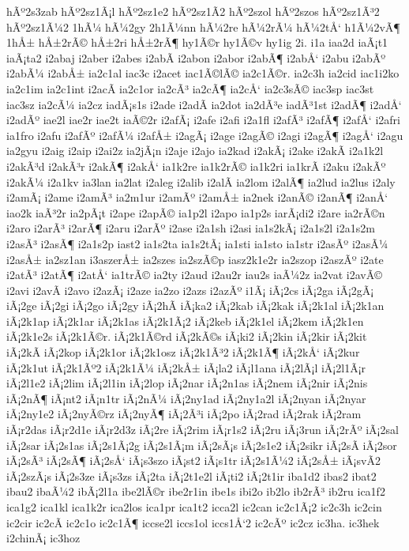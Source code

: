 {hÃº2s3zab
hÃº2sz1Ã¡l
hÃº2sz1e2
hÃº2sz1Ã­2
hÃº2szol
hÃº2szos
hÃº2sz1Ã³2
hÃº2sz1Ã¼2
1hÃ¼
hÃ¼2gy
2h1Ã¼nn
hÃ¼2re
hÃ¼2rÃ¼
hÃ¼2tÅ‘
h1Ã¼2vÃ¶
1hÅ±
hÅ±2rÃ©
hÅ±2ri
hÅ±2rÃ¶
hy1Ã©r
hy1Ã©v
hy1ig
2i.
i1a
iaa2d
iaÃ¡t1
iaÃ¡ta2
i2abaj
i2aber
i2abes
i2abÃ­
i2abon
i2abor
i2abÃ¶
i2abÅ‘
i2abu
i2abÃº
i2abÃ¼
i2abÅ±
ia2c1al
iac3c
i2acet
iac1Ã©lÃ©
ia2c1Ã©r.
ia2c3h
ia2cid
iac1i2ko
ia2c1im
ia2c1int
i2acÃ­
ia2c1or
ia2cÃ³
ia2cÃ¶
ia2cÅ‘
ia2c3sÃ©
iac3sp
iac3st
iac3sz
ia2cÃ¼
ia2cz
iadÃ¡s1s
i2ade
i2adÃ­
ia2dot
ia2dÃ³e
iadÃ³1st
i2adÃ¶
i2adÅ‘
i2adÃº
iae2l
iae2r
iae2t
iaÃ©2r
i2afÃ¡
i2afe
i2afi
i2a1fl
i2afÃ³
i2afÃ¶
i2afÅ‘
i2afri
ia1fro
i2afu
i2afÃº
i2afÃ¼
i2afÅ±
i2agÃ¡
i2age
i2agÃ©
i2agi
i2agÃ¶
i2agÅ‘
i2agu
ia2gyu
i2aig
i2aip
i2ai2z
ia2jÃ¡n
i2aje
i2ajo
ia2kad
i2akÃ¡
i2ake
i2akÃ­
i2a1k2l
i2akÃ³d
i2akÃ³r
i2akÃ¶
i2akÅ‘
ia1k2re
ia1k2rÃ©
ia1k2ri
ia1krÃ­
i2aku
i2akÃº
i2akÃ¼
i2a1kv
ia3lan
ia2lat
i2aleg
i2alib
i2alÃ­
ia2lom
i2alÃ¶
ia2lud
ia2lus
i2aly
i2amÃ¡
i2ame
i2amÃ³
ia2m1ur
i2amÃº
i2amÅ±
ia2nek
i2anÃ©
i2anÃ¶
i2anÅ‘
iao2k
iaÃ³2r
ia2pÃ¡t
i2ape
i2apÃ©
ia1p2l
i2apo
ia1p2s
iarÃ¡di2
i2are
ia2rÃ©n
i2aro
i2arÃ³
i2arÃ¶
i2aru
i2arÃº
i2ase
i2a1sh
i2asi
ia1s2kÃ¡
i2a1s2l
i2a1s2m
i2asÃ³
i2asÃ¶
i2a1s2p
iast2
ia1s2ta
ia1s2tÃ¡
ia1sti
ia1sto
ia1str
i2asÃº
i2asÃ¼
i2asÅ±
ia2sz1an
i3aszerÅ±
ia2szes
ia2szÃ©p
iasz2k1e2r
ia2szop
i2aszÃº
i2ate
i2atÃ³
i2atÃ¶
i2atÅ‘
ia1trÃ©
ia2ty
i2aud
i2au2r
iau2s
iaÃ¼2z
ia2vat
i2avÃ©
i2avi
i2avÃ­
i2avo
i2azÃ¡
i2aze
ia2zo
i2azs
i2azÃº
i1Ã¡
iÃ¡2cs
iÃ¡2ga
iÃ¡2gÃ¡
iÃ¡2ge
iÃ¡2gi
iÃ¡2go
iÃ¡2gy
iÃ¡2hÃ­
iÃ¡ka2
iÃ¡2kab
iÃ¡2kak
iÃ¡2k1al
iÃ¡2k1an
iÃ¡2k1ap
iÃ¡2k1ar
iÃ¡2k1as
iÃ¡2k1Ã¡2
iÃ¡2keb
iÃ¡2k1el
iÃ¡2kem
iÃ¡2k1en
iÃ¡2k1e2s
iÃ¡2k1Ã©r.
iÃ¡2k1Ã©rd
iÃ¡2kÃ©s
iÃ¡ki2
iÃ¡2kin
iÃ¡2kir
iÃ¡2kit
iÃ¡2kÃ­
iÃ¡2kop
iÃ¡2k1or
iÃ¡2k1osz
iÃ¡2k1Ã³2
iÃ¡2k1Ã¶
iÃ¡2kÅ‘
iÃ¡2kur
iÃ¡2k1ut
iÃ¡2k1Ãº2
iÃ¡2k1Ã¼
iÃ¡2kÅ±
iÃ¡la2
iÃ¡l1ana
iÃ¡2lÃ¡l
iÃ¡2l1Ã¡r
iÃ¡2l1e2
iÃ¡2lim
iÃ¡2l1in
iÃ¡2lop
iÃ¡2nar
iÃ¡2n1as
iÃ¡2nem
iÃ¡2nir
iÃ¡2nis
iÃ¡2nÃ¶
iÃ¡nt2
iÃ¡n1tr
iÃ¡2nÃ¼
iÃ¡2ny1ad
iÃ¡2ny1a2l
iÃ¡2nyan
iÃ¡2nyar
iÃ¡2ny1e2
iÃ¡2nyÃ©rz
iÃ¡2nyÃ¶
iÃ¡2Ã³i
iÃ¡2po
iÃ¡2rad
iÃ¡2rak
iÃ¡2ram
iÃ¡r2das
iÃ¡r2d1e
iÃ¡r2d3z
iÃ¡2re
iÃ¡2rim
iÃ¡r1s2
iÃ¡2ru
iÃ¡3run
iÃ¡2rÃº
iÃ¡2sal
iÃ¡2sar
iÃ¡2s1as
iÃ¡2s1Ã¡2g
iÃ¡2s1Ã¡m
iÃ¡2sÃ¡s
iÃ¡2s1e2
iÃ¡2sikr
iÃ¡2sÃ­
iÃ¡2sor
iÃ¡2sÃ³
iÃ¡2sÃ¶
iÃ¡2sÅ‘
iÃ¡s3szo
iÃ¡st2
iÃ¡s1tr
iÃ¡2s1Ã¼2
iÃ¡2sÅ±
iÃ¡svÃ­2
iÃ¡2szÃ¡s
iÃ¡2s3ze
iÃ¡s3zs
iÃ¡2ta
iÃ¡2t1e2l
iÃ¡ti2
iÃ¡2t1ir
iba1d2
ibas2
ibat2
ibau2
ibaÃ¼2
ibÃ¡2l1a
ibe2lÃ©r
ibe2r1in
ibe1s
ibi2o
ib2lo
ib2rÃ³
ib2ru
ica1f2
ica1g2
ica1kl
ica1k2r
ica2los
ica1pr
ica1t2
icca2l
ic2can
ic2c1Ã¡2
ic2c3h
ic2cin
ic2cir
ic2cÃ­
ic2c1o
ic2c1Ã¶
iccse2l
iccs1ol
iccs1Å‘2
ic2cÃº
ic2cz
ic3ha.
ic3hek
i2chinÃ¡
ic3hoz
}
